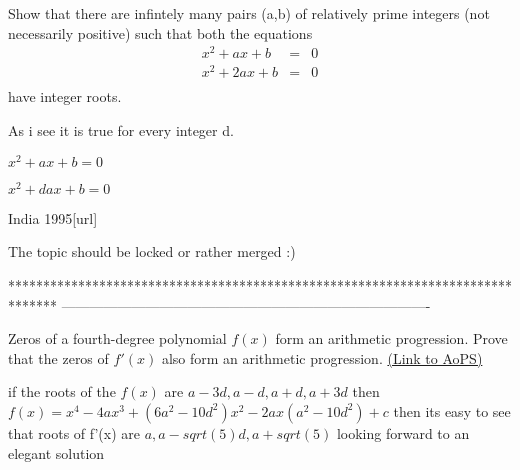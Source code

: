 \begin{solution}
	\begin{tcolorbox}Show that there are infintely many pairs (a,b) of relatively prime integers (not necessarily positive) such that both the equations \begin{eqnarray*} x^2 +ax +b &=& 0 \\ x^2 + 2ax + b &=& 0 \\ \end{eqnarray*} have integer roots.\end{tcolorbox}

As i see it is true for every integer d.

$x^2+ax+b=0$

$x^2+dax+b=0$
\end{solution}



\begin{solution}India 1995[\/url]

The topic should be locked or rather merged :)
\end{solution}
*******************************************************************************
-------------------------------------------------------------------------------

\begin{problem}
	Zeros of a fourth-degree polynomial $f (x)$ form an arithmetic progression. Prove that the zeros of $f '(x)$ also form an arithmetic progression.
	\flushright \href{https://artofproblemsolving.com/community/c6h617386}{(Link to AoPS)}
\end{problem}



\begin{solution}
	if the roots of the $f(x)$ are $a-3d, a-d, a+d, a+3d$ then  $f(x)=x^4-4ax^3+(6a^2-10d^2)x^2-2ax(a^2-10d^2)+c$ then its easy to see that roots of f'(x) are $a, a-sqrt(5)d, a+sqrt(5)$
looking forward to an elegant solution
\end{solution}



